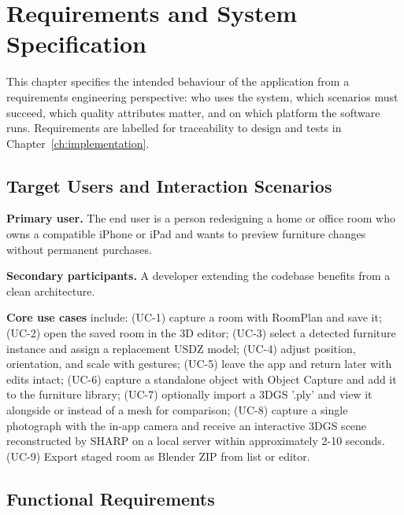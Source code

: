\chapter{Requirements and System Specification}
\label{ch:requirements}

This chapter specifies the intended behaviour of the application from a requirements engineering perspective: who uses the system, which scenarios must succeed, which quality attributes matter, and on which platform the software runs. Requirements are labelled for traceability to design and tests in Chapter~\ref{ch:implementation}.

\section{Target Users and Interaction Scenarios}

\textbf{Primary user.} The end user is a person redesigning a home or office room who owns a compatible iPhone or iPad and wants to preview furniture changes without permanent purchases.

\textbf{Secondary participants.} A developer extending the codebase benefits from a clean architecture.

\textbf{Core use cases} include: (UC-1) capture a room with RoomPlan and save it; (UC-2) open the saved room in the 3D editor; (UC-3) select a detected furniture instance and assign a replacement USDZ model; (UC-4) adjust position, orientation, and scale with gestures; (UC-5) leave the app and return later with edits intact; (UC-6) capture a standalone object with Object Capture and add it to the furniture library; (UC-7) optionally import a 3DGS '.ply' and view it alongside or
instead of a mesh for comparison; (UC-8) capture a single photograph with
the in-app camera and receive an interactive 3DGS scene reconstructed by
SHARP on a local server within approximately 2-10 seconds. (UC-9) Export staged room as Blender ZIP from list or editor.


\section{Functional Requirements}
\label{sec:func_req}

